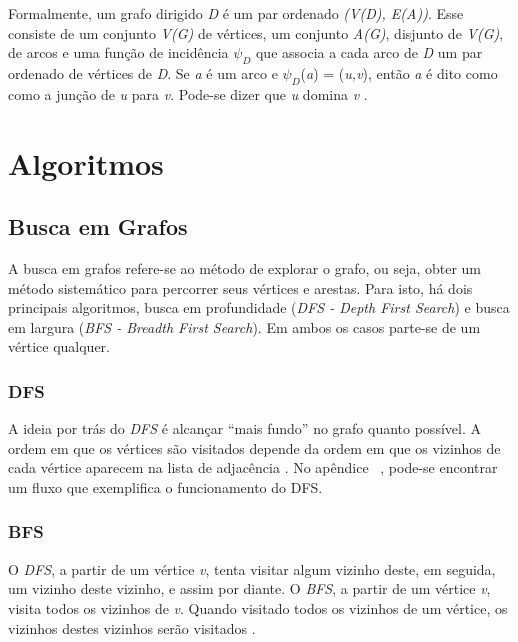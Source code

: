 Formalmente, um grafo dirigido \textit{D} é um par ordenado \textit{(V(D), E(A))}. Esse consiste de um conjunto \textit{V(G)} de vértices, um conjunto \textit{A(G)}, disjunto de \textit{V(G)}, de arcos e uma função de incidência $\psi_D$ que associa a cada arco de \textit{D} um par ordenado de vértices de \textit{D}. Se \textit{a} é um arco e $\psi_D$(\textit{a}) = (\textit{u,v}), então \textit{a} é dito como como a junção de \textit{u} para \textit{v}. Pode-se dizer que \textit{u} domina \textit{v} \cite{Diestel:1997}.

\section{Algoritmos}

\subsection{Busca em Grafos}

A busca em grafos refere-se ao método de explorar o grafo, ou seja, obter um método sistemático para percorrer seus vértices e arestas. Para isto, há dois principais algoritmos, busca em profundidade (\textit{DFS - Depth First Search}) e busca em largura (\textit{BFS - Breadth First Search}). Em ambos os casos parte-se de um vértice qualquer.

\subsubsection{DFS}
\label{subsec:dfs}

A ideia por trás do \textit{DFS} é alcançar ``mais fundo'' no grafo quanto possível. A ordem em que os vértices são visitados depende da ordem em que os vizinhos de cada vértice aparecem na lista de adjacência \cite{Cormen:2001}. No apêndice ~, pode-se encontrar um fluxo que exemplifica o funcionamento do DFS.

\subsubsection{BFS}
\label{subsec:bfs}

O \textit{DFS}, a partir de um vértice \textit{v}, tenta visitar algum vizinho deste, em seguida, um vizinho deste vizinho, e assim por diante. O \textit{BFS}, a partir de um vértice \textit{v}, visita todos os vizinhos de \textit{v}. Quando visitado todos os vizinhos de um vértice, os vizinhos destes vizinhos serão visitados \cite{Brassard:1988}.

